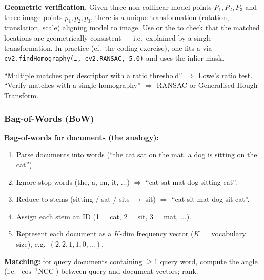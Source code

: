 \textbf{Geometric verification.} Given three non-collinear model points $P_1, P_2, P_3$ and three image points $p_1, p_2, p_3$, there is a unique transformation (rotation, translation, scale) aligning model to image. Use  or the  to check that the matched locations are geometrically consistent — i.e.\ explained by a single transformation. In practice (cf.\ the coding exercise), one fits a  via \texttt{cv2.findHomography(\dots, cv2.RANSAC, 5.0)} and uses the inlier mask.

\begin{tipbox}
``Multiple matches per descriptor with a ratio threshold'' $\Rightarrow$ Lowe's ratio test. ``Verify matches with a single homography'' $\Rightarrow$ RANSAC or Generalised Hough Transform.
\end{tipbox}

\bigseparator

\subsubsection{Bag-of-Words (BoW)}

\textbf{Bag-of-words for documents (the analogy):}
\begin{enumerate}
  \item Parse documents into words (``the cat sat on the mat. a dog is sitting on the cat'').
  \item Ignore stop-words (the, a, on, it, $\ldots$) $\Rightarrow$ ``cat sat mat dog sitting cat''.
  \item Reduce to stems (sitting / sat / sits $\to$ sit) $\Rightarrow$ ``cat sit mat dog sit cat''.
  \item Assign each stem an ID (1 = cat, 2 = sit, 3 = mat, $\ldots$).
  \item Represent each document as a $K$-dim frequency vector ($K =$ vocabulary size), e.g.\ $(2, 2, 1, 1, 0, \ldots)$.
\end{enumerate}
\textbf{Matching:} for query documents containing $\geq 1$ query word, compute the angle (i.e.\ $\cos^{-1}\text{NCC}$) between query and document vectors; rank.

\separator

